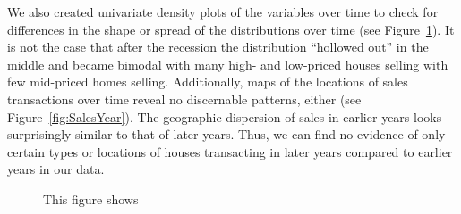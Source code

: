 \documentclass{article}\usepackage{graphicx, color}
\begin{document}
We also created univariate density plots of the variables over time to check for differences in the shape or spread of the distributions over time (see Figure~\ref{fig:DensityPlots}). It is not the case that after the recession the distribution ``hollowed out'' in the middle and became bimodal with many high- and low-priced houses selling with few mid-priced homes selling. Additionally, maps of the locations of sales transactions over time reveal no discernable patterns, either (see Figure~\ref{fig:SalesYear}). The geographic dispersion of sales in earlier years looks surprisingly similar to that of later years. Thus, we can find no evidence of only certain types or locations of houses transacting in later years compared to earlier years in our data.

\begin{figure}
\caption{This figure shows }\label{fig:DensityPlots}
\end{figure}
\end{document}
